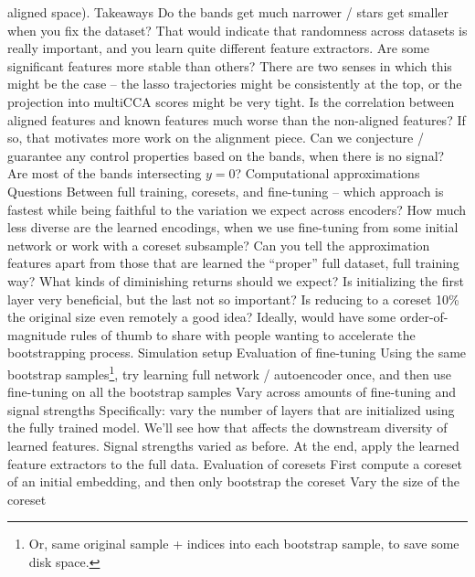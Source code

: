 \documentclass[11pt]{article}
\begin{document}
\begin{outline}
        aligned space).
      \3 Takeaways
        \4 Do the bands get much narrower / stars get smaller when you fix the
        dataset? That would indicate that randomness across datasets is really
        important, and you learn quite different feature extractors.
        \4 Are some significant features more stable than others? There are two
        senses in which this might be the case -- the lasso trajectories might
        be consistently at the top, or the projection into multiCCA scores might
        be very tight.
        \4 Is the correlation between aligned features and known features much
        worse than the non-aligned features? If so, that motivates more work on
        the alignment piece.
        \4 Can we conjecture / guarantee any control properties based on the
        bands, when there is no signal? Are most of the bands intersecting $y =
        0$?
  \1 Computational approximations
    \2 Questions
      \3 Between full training, coresets, and fine-tuning -- which approach is
      fastest while being faithful to the variation we expect across encoders?
      \3 How much less diverse are the learned encodings, when we use
      fine-tuning from some initial network or work with a coreset subsample?
      \3 Can you tell the approximation features apart from those that are
      learned the ``proper'' full dataset, full training way?
      \3 What kinds of diminishing returns should we expect? Is initializing the
      first layer very beneficial, but the last not so important? Is reducing to
      a coreset 10\% the original size even remotely a good idea? Ideally, would
      have some order-of-magnitude rules of thumb to share with people wanting
      to accelerate the bootstrapping process.
    \2 Simulation setup
      \3 Evaluation of fine-tuning
        \4 Using the same bootstrap samples\footnote{Or, same original sample +
          indices into each bootstrap sample, to save some disk space.}, try
        learning full network / autoencoder once, and then use fine-tuning on
        all the bootstrap samples
        \4 Vary across amounts of fine-tuning and signal strengths
        \4 Specifically: vary the number of layers that are initialized using
        the fully trained model. We'll see how that affects the downstream
        diversity of learned features. Signal strengths varied as before.
        \4 At the end, apply the learned feature extractors to the full data.
      \3 Evaluation of coresets
        \4 First compute a coreset of an initial embedding, and then only
        bootstrap the coreset
        \4 Vary the size of the coreset

\end{outline}
\end{document}
